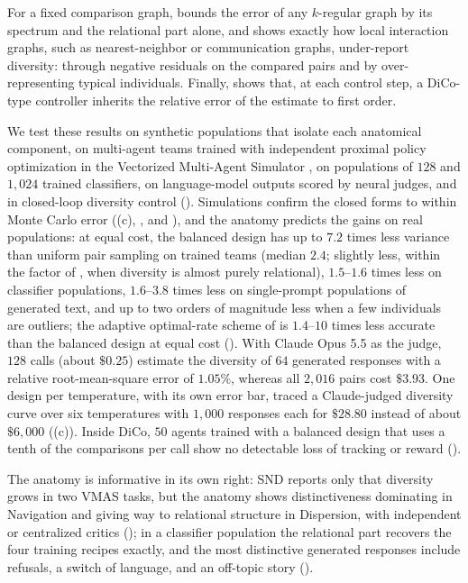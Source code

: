 \documentclass[twoside,11pt]{article}
\begin{document}
For a fixed comparison graph,  bounds the error
of any $k$\nobreakdash-regular graph by its spectrum and the relational part
alone, and  shows exactly how local interaction
graphs, such as nearest-neighbor or communication graphs, under-report
diversity: through negative residuals on the compared pairs and by
over-representing typical individuals.
Finally,  shows that, at each control step, a DiCo-type
controller inherits the relative error of the estimate to first order.

We test these results on synthetic populations that isolate each
anatomical component, on multi-agent teams trained with independent
proximal policy optimization \citep[PPO;][]{schulman2017proximal,dewitt2020independent}
in the Vectorized Multi\nobreakdash-Agent Simulator \citep[VMAS;][]{bettini2022vmas},
on populations of $128$ and $1{,}024$ trained classifiers, on
language-model outputs scored by neural judges, and in closed-loop
diversity control (). Simulations confirm the closed
forms to within Monte Carlo error ((c), ,
and ), and the anatomy predicts the gains on real
populations: at equal cost, the balanced design has up to $7.2$ times less
variance than uniform pair sampling on trained teams (median $2.4$; slightly
less, within the factor of , when diversity is almost
purely relational),
$1.5$--$1.6$ times less on classifier populations, $1.6$--$3.8$ times less on
single-prompt populations of generated text, and up to two orders of
magnitude less when a few individuals are outliers; the adaptive optimal-rate scheme of
\citet{chechik2015average} is $1.4$--$10$ times less accurate than the
balanced design at equal cost (). With
Claude Opus 5.5 as the judge, $128$ calls (about $\$0.25$) estimate the
diversity of $64$ generated responses with a relative root-mean-square error
of $1.05\%$, whereas all $2{,}016$ pairs cost $\$3.93$. One design per temperature, with
its own error bar, traced a Claude-judged diversity curve over six
temperatures with $1{,}000$ responses each for $\$28.80$ instead of about
$\$6{,}000$ ((c)). Inside DiCo, $50$ agents trained with a balanced
design that uses a tenth of the comparisons per call show no detectable loss
of tracking or reward ().

The anatomy is informative in its own right: SND reports only that diversity
grows in two VMAS tasks, but the anatomy shows distinctiveness dominating in
Navigation and giving way to relational structure in Dispersion, with
independent or centralized critics (); in a classifier population the relational part
recovers the four training recipes exactly, and the most distinctive
generated responses include refusals, a switch of language, and an
off-topic story ().
\end{document}
